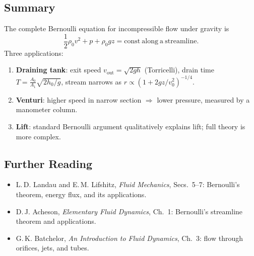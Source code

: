\documentclass[../main.tex]{subfiles}
\begin{document}

\subsection*{Summary}

The complete Bernoulli equation for incompressible flow under gravity is
\begin{equation}
  \boxed{\frac{1}{2}\rho_0 v^2 + p + \rho_0 g z = \mathrm{const\ along\ a\ streamline}.}
\end{equation}
Three applications:
\begin{enumerate}
  \item \textbf{Draining tank}: exit speed $v_{\mathrm{out}}=\sqrt{2gh}$ (Torricelli), drain time $T=\frac{A_0}{A_1}\sqrt{2h_0/g}$, stream narrows as $r\propto(1+2gz/v_0^2)^{-1/4}$.
  \item \textbf{Venturi}: higher speed in narrow section $\Rightarrow$ lower pressure, measured by a manometer column.
  \item \textbf{Lift}: standard Bernoulli argument qualitatively explains lift; full theory is more complex.
\end{enumerate}

\subsection*{Further Reading}
\begin{itemize}
  \item L.\,D. Landau and E.\,M. Lifshitz, \textit{Fluid Mechanics}, Secs.\ 5--7: Bernoulli's theorem, energy flux, and its applications.
  \item D.\,J. Acheson, \textit{Elementary Fluid Dynamics}, Ch.\ 1: Bernoulli's streamline theorem and applications.
  \item G.\,K. Batchelor, \textit{An Introduction to Fluid Dynamics}, Ch.\ 3: flow through orifices, jets, and tubes.
\end{itemize}
\end{document}
